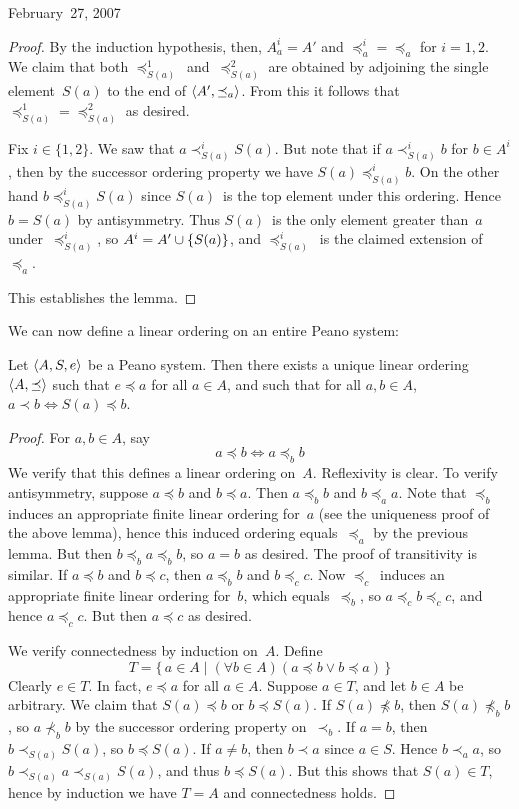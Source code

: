 \begin{lecture}{February~27, 2007}
\begin{proof}
By the induction hypothesis, then, \(A_a^i=A'\) and \({\preceq_a^i}={\preceq_a}\) for \(i=1,2\). We claim that both \(\preceq_{S(a)}^1\)~and~\(\preceq_{S(a)}^2\) are obtained by adjoining the single element~\(S(a)\) to the end of \(\langle{A'},{\preceq_a}\rangle\). From this it follows that \({\preceq_{S(a)}^1}={\preceq_{S(a)}^2}\) as desired.

Fix \(i\in\{1,2\}\). We saw that \(a\prec_{S(a)}^i S(a)\). But note that if \(a\prec_{S(a)}^i b\) for \(b\in A^i\), then by the successor ordering property we have \(S(a)\preceq_{S(a)}^i b\). On the other hand \(b\preceq_{S(a)}^i S(a)\) since \(S(a)\)~is the top element under this ordering. Hence \(b=S(a)\) by antisymmetry. Thus \(S(a)\)~is the only element greater than~\(a\) under~\(\preceq_{S(a)}^i\), so \(A^i=A'\cup\{S(a)\}\), and \(\preceq_{S(a)}^i\)~is the claimed extension of~\(\preceq_a\).

This establishes the lemma.
\end{proof}
\noindent We can now define a linear ordering on an entire Peano system:
\begin{thm}
Let \(\langle{A},{{S},{e}}\rangle\) be a Peano system. Then there exists a unique linear ordering \(\langle{A},{\preceq}\rangle\) such that \(e\preceq a\) for all \(a\in A\), and such that for all \(a,b\in A\), \(a\prec b\iff S(a)\preceq b\).
\end{thm}
\begin{proof}
For \(a,b\in A\), say
\[a\preceq b\iff a\preceq_b b\]
We verify that this defines a linear ordering on~\(A\). Reflexivity is clear. To verify antisymmetry, suppose \(a\preceq b\) and \(b\preceq a\). Then \(a\preceq_b b\) and \(b\preceq_a a\). Note that \(\preceq_b\) induces an appropriate finite linear ordering for~\(a\) (see the uniqueness proof of the above lemma), hence this induced ordering equals~\(\preceq_a\) by the previous lemma. But then \(b\preceq_b a\preceq_b b\), so \(a=b\) as desired. The proof of transitivity is similar. If \(a\preceq b\) and \(b\preceq c\), then \(a\preceq_b b\) and \(b\preceq_c c\). Now \(\preceq_c\)~induces an appropriate finite linear ordering for~\(b\), which equals~\(\preceq_b\), so \(a\preceq_c b\preceq_c c\), and hence \(a\preceq_c c\). But then \(a\preceq c\) as desired.

We verify connectedness by induction on~\(A\). Define
\[T=\{\,a\in A\mid (\forall b\in A)(a\preceq b\lor b\preceq a)\,\}\]
Clearly \(e\in T\). In fact, \(e\preceq a\) for all \(a\in A\). Suppose \(a\in T\), and let \(b\in A\) be arbitrary. We claim that \(S(a)\preceq b\) or \(b\preceq S(a)\). If \(S(a)\not\preceq b\), then \(S(a)\not\preceq_b b\), so \(a\not\prec_b b\) by the successor ordering property on~\(\prec_b\). If \(a=b\), then \(b\prec_{S(a)} S(a)\), so \(b\preceq S(a)\). If \(a\ne b\), then \(b\prec a\) since \(a\in S\). Hence \(b\prec_a a\), so \(b\prec_{S(a)} a\prec_{S(a)} S(a)\), and thus \(b\preceq S(a)\). But this shows that \(S(a)\in T\), hence by induction we have \(T=A\) and connectedness holds.


\end{proof}
\end{lecture}
